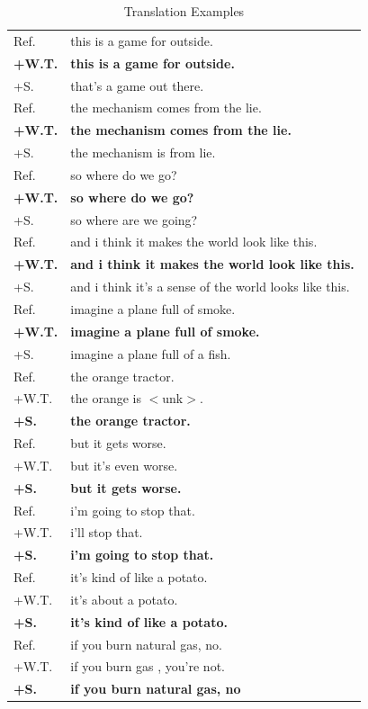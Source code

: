 \documentclass[11pt,a4paper]{article}
\begin{document}
\begin{table}[!htbp]
\centering
\begin{tabular}{l|l}
\hline
Ref.& this is a game for outside. \\
\textbf{+W.T.}& \textbf{this is a game for outside.}\\
+S.& that's a game out there.\\
\hline
Ref.& the mechanism comes from the lie.\\
\textbf{+W.T.}& \textbf{the mechanism comes from the lie.}\\
+S.& the mechanism is from lie.\\
\hline
Ref.& so where do we go?\\
\textbf{+W.T.}& \textbf{so where do we go?}\\
+S.& so where are we going?\\
\hline
Ref.& and i think it makes the world look like this.\\
\textbf{+W.T.}& \textbf{and i think it makes the world look like this.}\\
+S.& and i think it's a sense of the world looks like this.\\
\hline
Ref.& imagine a plane full of smoke.\\
\textbf{+W.T.}& \textbf{imagine a plane full of smoke.}\\
+S.& imagine a plane full of a fish.\\
\hline
Ref.& the orange tractor.\\
+W.T.& the orange is $<$unk$>$.\\
\textbf{+S.}& \textbf{the orange tractor.}\\
\hline
Ref.& but it gets worse.\\
+W.T.& but it's even worse.\\
\textbf{+S.}& \textbf{but it gets worse.}\\
\hline
Ref.& i'm going to stop that.\\
+W.T.& i'll stop that.\\
\textbf{+S.}& \textbf{i'm going to stop that.}\\
\hline
Ref.& it's kind of like a potato.\\
+W.T.& it's about a potato.\\
\textbf{+S.}& \textbf{it's kind of like a potato.}\\
\hline
Ref.& if you burn natural gas, no.\\
+W.T.& if you burn gas , you're not.\\
\textbf{+S.}& \textbf{if you burn natural gas, no}\\
\hline

\end{tabular}
\caption{Translation Examples}
\label{tx}
\end{table}
\end{document}
